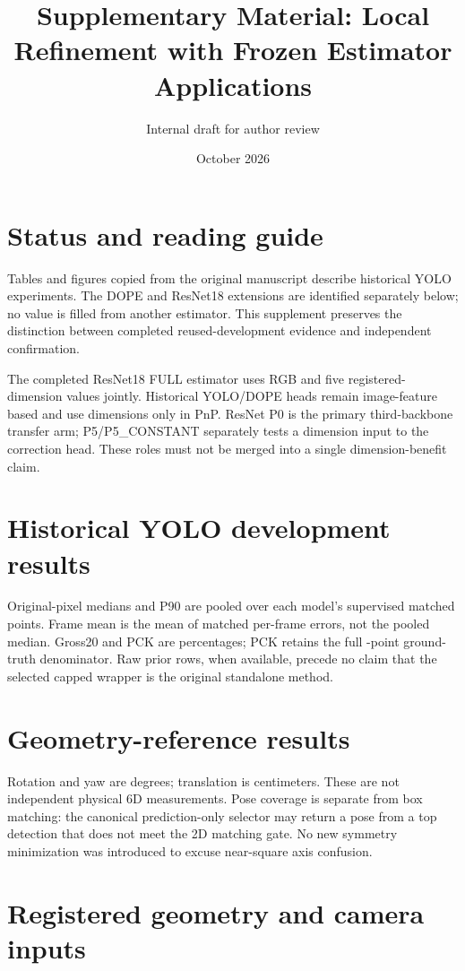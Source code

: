 \documentclass[10pt]{article}
\title{Supplementary Material: Local Refinement with Frozen Estimator Applications}
\author{Internal draft for author review}
\date{October 2026}
\begin{document}
\maketitle
\section{Status and reading guide}
Tables and figures copied from the original manuscript describe historical YOLO experiments. The DOPE and ResNet18 extensions are identified separately below; no value is filled from another estimator. This supplement preserves the distinction between completed reused-development evidence and independent confirmation. \PriorTrainingStatus{} \ConfirmationAbstract{}

The completed ResNet18 FULL estimator uses RGB and five registered-dimension values jointly. Historical YOLO/DOPE heads remain image-feature based and use dimensions only in PnP. ResNet P0 is the primary third-backbone transfer arm; P5/P5\_CONSTANT separately tests a dimension input to the correction head. These roles must not be merged into a single dimension-benefit claim.
\section{Historical YOLO development results}
Original-pixel medians and P90 are pooled over each model's supervised matched points. Frame mean is the mean of matched per-frame errors, not the pooled median. Gross20 and PCK are percentages; PCK retains the full \AllPoints{}-point ground-truth denominator. Raw prior rows, when available, precede no claim that the selected capped wrapper is the original standalone method.
\small\normalsize
\section{Geometry-reference results}
Rotation and yaw are degrees; translation is centimeters. These are not independent physical 6D measurements. Pose coverage is separate from box matching: the canonical prediction-only selector may return a pose from a top detection that does not meet the 2D matching gate. No new symmetry minimization was introduced to excuse near-square axis confusion.
\small\normalsize
\section{Registered geometry and camera inputs}
\small\normalsize
\end{document}
